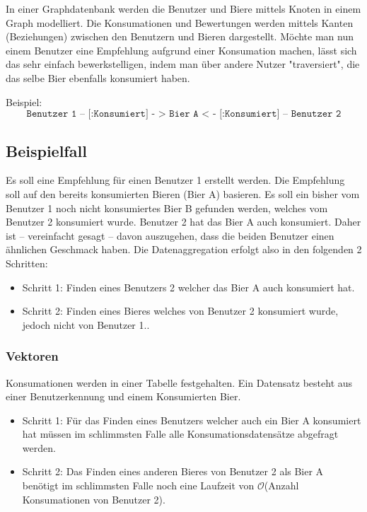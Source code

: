 \documentclass[10pt,a4paper]{scrartcl}
\begin{document}
In einer Graphdatenbank werden die Benutzer und Biere mittels Knoten in einem Graph
modelliert. Die Konsumationen und Bewertungen werden mittels Kanten
(Beziehungen) zwischen den Benutzern und Bieren dargestellt. Möchte man nun einem
Benutzer eine Empfehlung aufgrund einer Konsumation machen, lässt
sich das sehr einfach bewerkstelligen, indem man über andere Nutzer "traversiert", die
das selbe Bier ebenfalls konsumiert haben.

Beispiel: $$\texttt{Benutzer 1 -- [:Konsumiert] - > Bier A < - [:Konsumiert] -- Benutzer 2}$$

\subsection{Beispielfall}

Es soll eine Empfehlung für einen Benutzer 1 erstellt werden. Die Empfehlung soll auf den bereits
konsumierten Bieren (Bier A) basieren. Es soll ein bisher vom Benutzer 1 noch nicht konsumiertes
Bier B gefunden werden, welches vom Benutzer 2 konsumiert wurde. Benutzer 2 hat das Bier A auch
konsumiert. Daher ist -- vereinfacht gesagt -- davon auszugehen, dass die beiden Benutzer einen
ähnlichen Geschmack haben. Die Datenaggregation erfolgt also in den folgenden 2 Schritten:

\begin{itemize}
	\item Schritt 1: Finden eines Benutzers 2 welcher das Bier A auch konsumiert hat.
	\item Schritt 2: Finden eines Bieres welches von Benutzer 2 konsumiert wurde, jedoch nicht von
		Benutzer 1..
\end{itemize}

\subsubsection{Vektoren}

Konsumationen werden in einer Tabelle festgehalten. Ein Datensatz besteht aus einer Benutzerkennung
und einem Konsumierten Bier.

\begin{itemize}
	\item Schritt 1: Für das Finden eines Benutzers welcher auch ein Bier A konsumiert hat müssen im
		schlimmsten Falle alle Konsumationsdatensätze abgefragt werden.
	\item Schritt 2: Das Finden eines anderen Bieres von Benutzer 2 als Bier A benötigt im schlimmsten
		Falle noch eine Laufzeit von $\mathcal{O}$(Anzahl Konsumationen von Benutzer 2).
\end{itemize}
\end{document}
